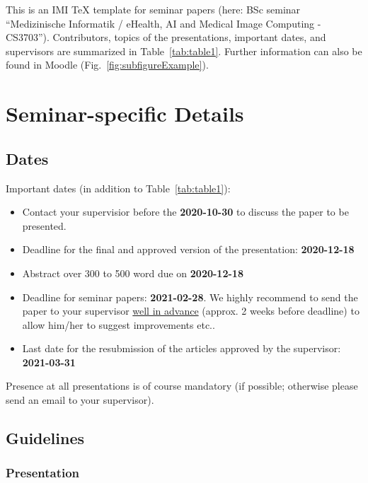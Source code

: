 \documentclass[
12pt,
headsepline,
bibliography=totoc,
twoside=semi,
fleqn
]{scrartcl}
\begin{document}
This is an IMI TeX template for seminar papers (here: BSc seminar ``Medizinische Informatik / eHealth, AI and Medical Image Computing - CS3703''). Contributors, topics of the presentations, important dates, and supervisors are summarized in Table~\ref{tab:table1}. Further information can also be found in Moodle (Fig.~\ref{fig:subfigureExample}).


\section{Seminar-specific Details\label{sec:sec2}}


\subsection{Dates\label{sec:sec2-1}}

Important dates (in addition to Table~\ref{tab:table1}):

\begin{itemize}
  \item Contact your supervisior before the \textbf{2020-10-30} to discuss the paper to be presented.
  \item Deadline for the final and approved version of the presentation: \textbf{2020-12-18}
  \item Abstract over 300 to 500 word due on \textbf{2020-12-18}
  \item Deadline for seminar papers: \textbf{2021-02-28}. We highly recommend to send the paper to your supervisor \underline{well in advance} (approx. 2 weeks before deadline) to allow him/her to suggest improvements etc..
  \item Last date for the resubmission of the articles approved by the supervisor: \textbf{2021-03-31}
\end{itemize}

\noindent Presence at all presentations is of course mandatory (if possible; otherwise please send an email to your supervisor).


\subsection{Guidelines\label{sec:sec2-2}}

\subsubsection{Presentation}
 
\end{document}
